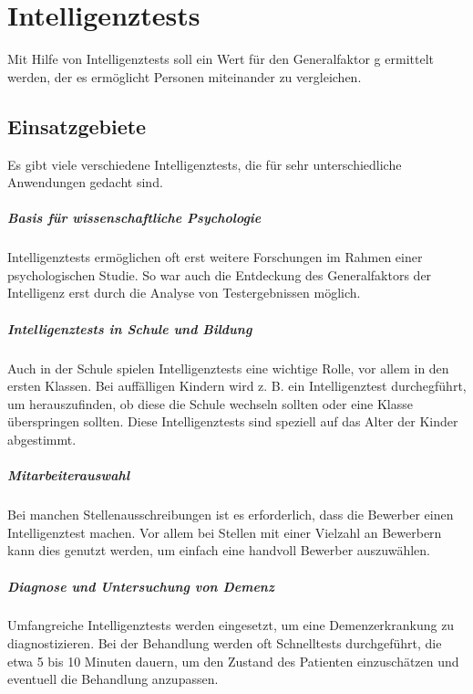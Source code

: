 \chapter{Intelligenztests}
Mit Hilfe von Intelligenztests soll ein Wert für den Generalfaktor g ermittelt werden, der es ermöglicht Personen miteinander zu vergleichen.

\section{Einsatzgebiete}
Es gibt viele verschiedene Intelligenztests, die für sehr unterschiedliche Anwendungen gedacht sind.

\paragraph{Basis für wissenschaftliche Psychologie}
Intelligenztests ermöglichen oft erst weitere Forschungen im Rahmen einer psychologischen Studie. So war auch die Entdeckung des Generalfaktors der Intelligenz erst durch die Analyse von Testergebnissen möglich.

\paragraph{Intelligenztests in Schule und Bildung}
Auch in der Schule spielen Intelligenztests eine wichtige Rolle, vor allem in den ersten Klassen. Bei auffälligen Kindern wird z. B. ein Intelligenztest durchegführt, um herauszufinden, ob diese die Schule wechseln sollten oder eine Klasse überspringen sollten. Diese Intelligenztests sind speziell auf das Alter der Kinder abgestimmt.

\paragraph{Mitarbeiterauswahl}
Bei manchen Stellenausschreibungen ist es erforderlich, dass die Bewerber einen Intelligenztest machen. Vor allem bei Stellen mit einer Vielzahl an Bewerbern kann dies genutzt werden, um einfach eine handvoll Bewerber auszuwählen.

\paragraph{Diagnose und Untersuchung von Demenz}
Umfangreiche Intelligenztests werden eingesetzt, um eine Demenzerkrankung zu diagnostizieren. Bei der Behandlung werden oft Schnelltests durchgeführt, die etwa 5 bis 10 Minuten dauern, um den Zustand des Patienten einzuschätzen und eventuell die Behandlung anzupassen.
\cite{geok15}

